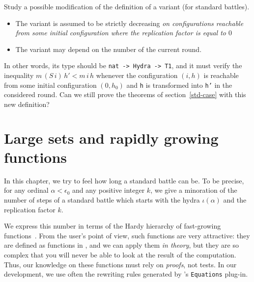 \begin{project}
Study a possible modification of the definition of a variant  (for  standard battles).

\begin{itemize}
\item The variant is assumed to be strictly decreasing \emph{on configurations 
reachable from some initial configuration where the replication factor is equal to $0$}
\item The variant may depend on the number of the current round.
\end{itemize}

In other words, its type should be \texttt{nat -> Hydra -> T1}, and it must 
verify the inequality $m\, (S\,i)\, h' < m\,i\, h$ whenever the configuration 
$(i,h)$ is reachable from some initial configuration $(0,h_0)$
and \texttt{h} is transformed into \texttt{h'} in the considered round.
Can we still prove the theorems of section~\ref{std-case} with this new definition?

\end{project}



\chapter{Large sets and rapidly growing functions}\label{chap:alpha-large}



In this chapter, we try to feel how long a standard battle can be.
To be precise, for any ordinal $\alpha<\epsilon_0$ and any positive integer $k$,
we give a minoration of the number of steps of a standard battle which
starts with the hydra $\iota(\alpha)$ and the replication factor $k$.

We express this number in terms of the Hardy hierarchy of fast-growing 
functions~\cite{BW85, Wainer1970, KS81, Promel2013}.
 From the \coq{} user's point of view, such  functions are  very 
attractive:  they are defined as functions  in \gallina{}, and we can apply them \emph{in theory}, but they are so complex that you will never be able to look at the result of the computation.
 Thus, our knowledge on these functions must rely on \emph{proofs}, not tests. In our development, we use often the rewriting rules generated by \coq's \texttt{Equations} plug-in.


